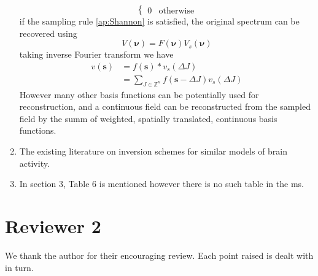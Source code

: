 \documentclass{article}
\begin{document}
\begin{enumerate}
{\begin{equation}
\begin{cases}
  0 & \text{otherwise}
\end{cases} 
\end{equation}
if the sampling rule \eqref{ap:Shannon} is satisfied, the original spectrum can be recovered using
\begin{equation}
 V(\boldsymbol\nu)=F(\boldsymbol \nu)V_s(\boldsymbol\nu)
\end{equation}
taking inverse Fourier transform we have
\begin{align}
v(\mathbf s)&=f(\mathbf s)\ast v_s(\Delta J) \\
&=\sum_{J \in \mathbb Z^n}f(\mathbf s-\Delta J) v_s(\Delta J)
\end{align}
However many other basis functions can be potentially used for reconstruction, and a continuous field can be reconstructed from the sampled field by the summ of weighted, spatially translated, continuous  basis functions.}


        \item The existing literature on inversion schemes for similar models of brain activity.
        \item In section 3, Table 6 is mentioned however there is no such table in the ms.
    \end{enumerate}
    
    \section{Reviewer 2}
    
    We thank the author for their encouraging review. Each point raised is dealt with in turn.
\end{document}
